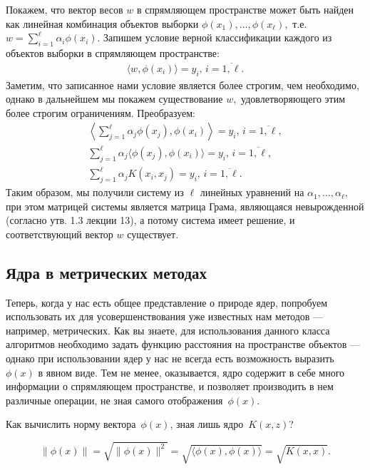 \documentclass[12pt,fleqn]{article}
\begin{document}
\begin{esSolution}
	Покажем, что вектор весов $w$ в спрямляющем пространстве может быть найден как линейная комбинация объектов выборки $\phi(x_1), \dots, \phi(x_\ell),$ т.е. $w = \sum_{i=1}^\ell \alpha_i \phi(x_i).$ Запишем условие верной классификации каждого из объектов выборки в спрямляющем пространстве:
	\begin{align*}
		\langle w, \phi(x_i) \rangle = y_i, \, i = \overline{1, \ell}. 
	\end{align*}
	Заметим, что записанное нами условие является более строгим, чем необходимо, однако в дальнейшем мы покажем существование $w,$ удовлетворяющего этим более строгим ограничениям. Преобразуем:
	\begin{align*}
		\left\langle \sum_{j=1}^\ell \alpha_j \phi(x_j), \phi(x_i) \right\rangle = y_i, \, i = \overline{1, \ell},\\
		\sum_{j=1}^\ell \alpha_j \langle \phi(x_j), \phi(x_i) \rangle = y_i, \, i = \overline{1, \ell},\\
		\sum_{j=1}^\ell \alpha_j K(x_i, x_j) = y_i, \, i = \overline{1, \ell}.	
	\end{align*}
	Таким образом, мы получили систему из $\ell$ линейных уравнений на $\alpha_1, \dots, \alpha_\ell,$ при этом матрицей системы является матрица Грама, являющаяся невырожденной (согласно утв. 1.3 лекции 13), а потому система имеет решение, и соответствующий вектор $w$ существует.
\end{esSolution}
	
\subsection{Ядра в метрических методах}
	Теперь, когда у нас есть общее представление о природе ядер, попробуем использовать их для усовершенствования уже известных нам методов — например, метрических. Как вы знаете, для использования данного класса алгоритмов необходимо задать функцию расстояния на пространстве объектов — однако при использовании ядер у нас не всегда есть возможность выразить $\phi(x)$ в явном виде. Тем не менее, оказывается, ядро содержит в себе 
	много информации о спрямляющем пространстве,
	и позволяет производить в нем различные операции, не зная самого
	отображения~$\phi(x)$.
\begin{vkProblem}
	Как вычислить норму вектора~$\phi(x)$, зная лишь ядро~$K(x, z)$?
\end{vkProblem}

\begin{esSolution}
	\[
	\|\phi(x)\|
	=
	\sqrt{\|\phi(x)\|^2}
	=
	\sqrt{\langle \phi(x), \phi(x) \rangle}
	=
	\sqrt{K(x, x)}.
	\]
\end{esSolution}
\end{document}
